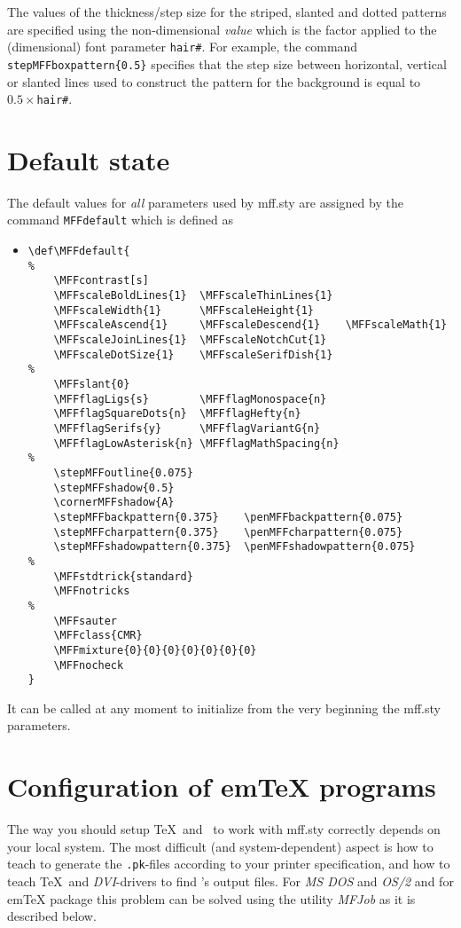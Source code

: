 The values of the thickness/step size for the
striped, slanted and dotted patterns
are specified using the non-dimensional {\em value}
which is the factor applied to the (dimensional)
font parameter {\tt hair\#}. For example,
the command {\tt\bs{}stepMFFboxpattern\{0.5\}}
specifies that the step size between horizontal,
vertical or slanted lines used to
construct the pattern for the background
is equal to $0.5\times${\tt hair\#}.

\section{Default state}

The default values for {\em all} parameters used by {\sc mff.sty}
are assigned by the command {\tt \bs{}MFFdefault} which
is defined as
\begin{itemize}
\item[]\small
\begin{verbatim}
\def\MFFdefault{
%
    \MFFcontrast[s]
    \MFFscaleBoldLines{1}  \MFFscaleThinLines{1}
    \MFFscaleWidth{1}      \MFFscaleHeight{1}
    \MFFscaleAscend{1}     \MFFscaleDescend{1}    \MFFscaleMath{1}
    \MFFscaleJoinLines{1}  \MFFscaleNotchCut{1}
    \MFFscaleDotSize{1}    \MFFscaleSerifDish{1}
%
    \MFFslant{0}
    \MFFflagLigs{s}        \MFFflagMonospace{n}
    \MFFflagSquareDots{n}  \MFFflagHefty{n}
    \MFFflagSerifs{y}      \MFFflagVariantG{n}
    \MFFflagLowAsterisk{n} \MFFflagMathSpacing{n}
%
    \stepMFFoutline{0.075}
    \stepMFFshadow{0.5}
    \cornerMFFshadow{A}
    \stepMFFbackpattern{0.375}    \penMFFbackpattern{0.075}
    \stepMFFcharpattern{0.375}    \penMFFcharpattern{0.075}
    \stepMFFshadowpattern{0.375}  \penMFFshadowpattern{0.075}
%
    \MFFstdtrick{standard}
    \MFFnotricks
%
    \MFFsauter
    \MFFclass{CMR}
    \MFFmixture{0}{0}{0}{0}{0}{0}{0}
    \MFFnocheck
}
\end{verbatim}
\end{itemize}
It can be called at any moment to initialize
from the very beginning the {\sc mff.sty} parameters.


\section{Configuration of {\sf em\TeX} programs\label{CONFIG}}

The way you should setup \TeX\ and \MF\ to work with {\sc mff.sty}
correctly depends on your local system.
The most difficult (and system-dependent) aspect is how to teach
\MF{} to generate the {\tt *.pk}-files according to
your printer specification, and how to teach \TeX\ and
{\sl DVI}-drivers to find \MF's output files.
For {\sl MS DOS} and {\sl OS/2} and for {\sf em\TeX}
package this problem can be solved using the utility {\sl MFJob}
as it is described below.

